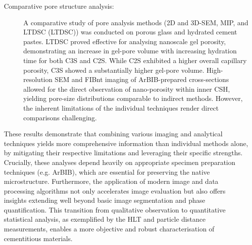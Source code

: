 \begin{description}
    \item[Comparative pore structure analysis:]
    A comparative study of pore analysis methods (2D and 3D-\ac{SEM}, \acl{MIP}, and \acl{LTDSC} (\acs{LTDSC})) was conducted on porous glass and hydrated cement pastes.
    \ac{LTDSC} proved effective for analysing nanoscale gel porosity, demonstrating an increase in gel-pore volume with increasing hydration time for both \ac{C3S} and \ac{C2S}.
    While \ac{C2S} exhibited a higher overall capillary porosity, \ac{C3S} showed a substantially higher gel-pore volume.
    High-resolution \ac{SEM} and \ac{FIBnt} imaging of \ac{ArBIB}-prepared cross-sections allowed for the direct observation of nano-porosity within inner \ac{CSH}, yielding pore-size distributions comparable to indirect methods.
    However, the inherent limitations of the individual techniques render direct comparisons challenging.

\end{description}

These results demonstrate that combining various imaging and analytical techniques yields more comprehensive information than individual methods alone, by mitigating their respective limitations and leveraging their specific strengths.
Crucially, these analyses depend heavily on appropriate specimen preparation techniques (e.g. \ac{ArBIB}), which are essential for preserving the native microstructure.
Furthermore, the application of modern image and data processing algorithms not only accelerates image evaluation but also offers insights extending well beyond basic image segmentation and phase quantification.
This transition from qualitative observation to quantitative statistical analysis, as exemplified by the \ac{HLT} and particle distance measurements, enables a more objective and robust characterisation of cementitious materials.

